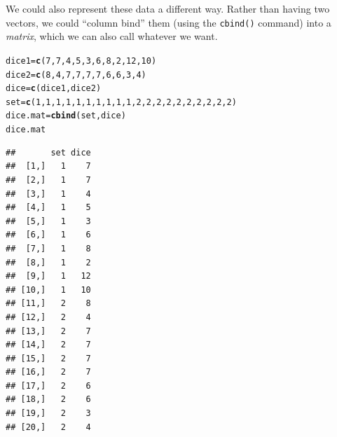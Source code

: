 \documentclass[12pt]{article}\usepackage[]{graphicx}\usepackage[]{color}
\makeatletter
\newcommand{\hlnum}[1]{\textcolor[rgb]{0.686,0.059,0.569}{#1}}%
\newcommand{\hlstd}[1]{\textcolor[rgb]{0.345,0.345,0.345}{#1}}%
\newcommand{\hlkwb}[1]{\textcolor[rgb]{0.69,0.353,0.396}{#1}}%
\newcommand{\hlkwd}[1]{\textcolor[rgb]{0.737,0.353,0.396}{\textbf{#1}}}%
\newenvironment{kframe}{%
 \def\at@end@of@kframe{}%
 \ifinner\ifhmode%
  \def\at@end@of@kframe{\end{minipage}}%
  \begin{minipage}{\columnwidth}%
 \fi\fi%
 \def\FrameCommand##1{\hskip\@totalleftmargin \hskip-\fboxsep
 \colorbox{shadecolor}{##1}\hskip-\fboxsep
     \hskip-\linewidth \hskip-\@totalleftmargin \hskip\columnwidth}%
 \MakeFramed {\advance\hsize-\width
   \@totalleftmargin\z@ \linewidth\hsize
   \@setminipage}}%
 {\par\unskip\endMakeFramed%
 \at@end@of@kframe}
\newenvironment{knitrout}{}{} %
\makeatother
\begin{document}
We could also represent these data a different way. Rather than having two vectors, we could ``column bind'' them (using the \verb|cbind()| command) into a \emph{matrix}, which we can also call whatever we want.
\begin{knitrout}
\color{fgcolor}\begin{kframe}
\begin{alltt}
\hlstd{dice1} \hlkwb{=} \hlkwd{c}\hlstd{(}\hlnum{7}\hlstd{,} \hlnum{7}\hlstd{,} \hlnum{4}\hlstd{,} \hlnum{5}\hlstd{,} \hlnum{3}\hlstd{,} \hlnum{6}\hlstd{,} \hlnum{8}\hlstd{,} \hlnum{2}\hlstd{,} \hlnum{12}\hlstd{,} \hlnum{10}\hlstd{)}
\hlstd{dice2} \hlkwb{=} \hlkwd{c}\hlstd{(}\hlnum{8}\hlstd{,} \hlnum{4}\hlstd{,} \hlnum{7}\hlstd{,} \hlnum{7}\hlstd{,} \hlnum{7}\hlstd{,} \hlnum{7}\hlstd{,} \hlnum{6}\hlstd{,} \hlnum{6}\hlstd{,} \hlnum{3}\hlstd{,} \hlnum{4}\hlstd{)}
\hlstd{dice} \hlkwb{=} \hlkwd{c}\hlstd{(dice1, dice2)}
\hlstd{set} \hlkwb{=} \hlkwd{c}\hlstd{(}\hlnum{1}\hlstd{,} \hlnum{1}\hlstd{,} \hlnum{1}\hlstd{,} \hlnum{1}\hlstd{,} \hlnum{1}\hlstd{,} \hlnum{1}\hlstd{,} \hlnum{1}\hlstd{,} \hlnum{1}\hlstd{,} \hlnum{1}\hlstd{,} \hlnum{1}\hlstd{,} \hlnum{2}\hlstd{,} \hlnum{2}\hlstd{,} \hlnum{2}\hlstd{,} \hlnum{2}\hlstd{,} \hlnum{2}\hlstd{,} \hlnum{2}\hlstd{,} \hlnum{2}\hlstd{,} \hlnum{2}\hlstd{,} \hlnum{2}\hlstd{,} \hlnum{2}\hlstd{)}
\hlstd{dice.mat} \hlkwb{=} \hlkwd{cbind}\hlstd{(set, dice)}
\hlstd{dice.mat}
\end{alltt}
\begin{verbatim}
##       set dice
##  [1,]   1    7
##  [2,]   1    7
##  [3,]   1    4
##  [4,]   1    5
##  [5,]   1    3
##  [6,]   1    6
##  [7,]   1    8
##  [8,]   1    2
##  [9,]   1   12
## [10,]   1   10
## [11,]   2    8
## [12,]   2    4
## [13,]   2    7
## [14,]   2    7
## [15,]   2    7
## [16,]   2    7
## [17,]   2    6
## [18,]   2    6
## [19,]   2    3
## [20,]   2    4
\end{verbatim}
\end{kframe}
\end{knitrout}
\end{document}
